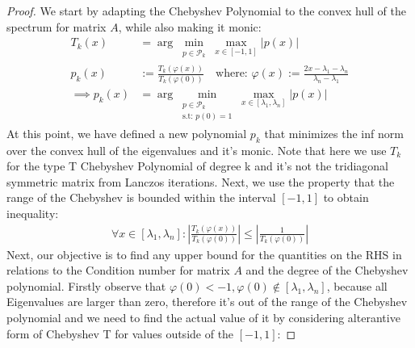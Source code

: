 \documentclass[]{article}
\theoremstyle{definition}
\begin{document}
            \begin{proof}
                We start by adapting the Chebyshev Polynomial to the convex hull of the spectrum for matrix $A$, while also making it monic: 
                \begin{align}
                    T_k(x) &= \arg\min_{
                        \substack{
                            p\in \mathcal{P}_{k}
                            }
                        }\max_{x\in [-1, 1]}|p(x)|
                    \\
                    p_k(x) &:= 
                    \frac{T_k(\varphi(x))}{T_k(\varphi(0))}
                    \quad 
                    \text{where: } 
                    \varphi(x) := \frac{2x - \lambda_1 - \lambda_n}{\lambda_n - \lambda_1}
                    \\
                    \implies p_k(x) &= \arg \min_{
                        \substack{
                            p\in \mathcal{P}_{k}
                            \\
                            \text{s.t: } p(0)  = 1
                        }
                    }\max_{x\in [\lambda_1, \lambda_n]}|p(x)|
                \end{align}
                At this point, we have defined a new polynomial $p_k$ that minimizes the inf norm over the convex hull of the eigenvalues and it's monic. Note that here we use $T_k$ for the type T Chebyshev Polynomial of degree k and it's not the tridiagonal symmetric matrix from Lanczos iterations. Next, we use the property that the range of the Chebyshev is bounded within the interval $[-1, 1]$ to obtain inequality: 
                \begin{align}
                    \forall x \in [\lambda_1, \lambda_n]: \left|
                    \frac{T_k(\varphi(x))}{T_k(\varphi(0))}
                    \right|
                    \le 
                    \left|
                        \frac{1}{T_k(\varphi(0))}
                    \right|
                \end{align}
                Next, our objective is to find any upper bound for the quantities on the RHS in relations to the Condition number for matrix $A$ and the degree of the Chebyshev polynomial. Firstly observe that $\varphi(0) < -1, \varphi(0) \not\in [\lambda_1, \lambda_n]$, because all Eigenvalues are larger than zero, therefore it's out of the range of the Chebyshev polynomial and we need to find the actual value of it by considering alterantive form of Chebyshev T for values outside of the $[-1,1]$: 

\end{proof}
\end{document}
